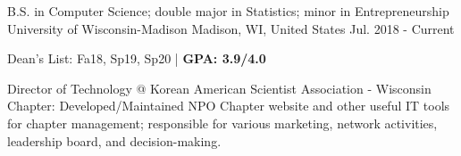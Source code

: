

\begin{cventries}

  \cventry
  {B.S. in Computer Science; double major in Statistics; minor in Entrepreneurship} %
  {University of Wisconsin-Madison} %
  {Madison, WI, United States} %
  {Jul. 2018 - Current} %
  {
    \begin{cvitems} %
      \item {Dean's List: Fa18, Sp19, Sp20 | \textbf{GPA: 3.9/4.0}}
      \item {Director of Technology @ Korean American Scientist Association - Wisconsin Chapter: Developed/Maintained NPO Chapter website and other useful IT tools for chapter management; responsible for various marketing, network activities, leadership board, and decision-making.}
    \end{cvitems}
  }

\end{cventries}
